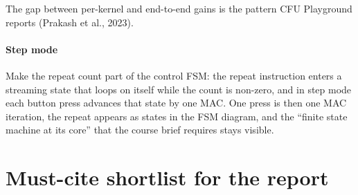 The gap between per-kernel and end-to-end gains is the pattern CFU Playground reports (Prakash et al., 2023).

\paragraph{Step mode} Make the repeat count part of the control FSM: the repeat instruction enters a streaming state that loops on itself while the count is non-zero, and in step mode each button press advances that state by one MAC. One press is then one MAC iteration, the repeat appears as states in the FSM diagram, and the “finite state machine at its core” that the course brief requires stays visible.

\section{Must-cite shortlist for the report}

